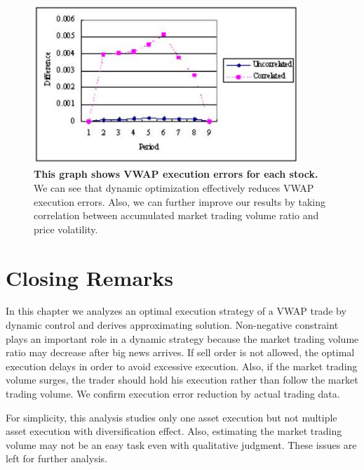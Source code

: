 \begin{figure}[htbp]
\begin{center}
 \includegraphics[width=10cm,height=6cm]{fg_d3n.png}
\end{center}
\caption[Graph of VWAP execution errors]{{\bf This graph shows VWAP execution 
errors for each stock.}
 \quad We can see that dynamic optimization effectively reduces VWAP execution 
errors.
 Also, we can further improve our results by taking correlation between 
accumulated market trading volume ratio
 and price volatility.}\label{fg_d3}
\end{figure}


\section{Closing Remarks}\label{sec_d4}
In this chapter we analyzes an optimal execution strategy of a VWAP trade by 
dynamic control and derives approximating solution. Non-negative constraint 
plays an important role in a dynamic strategy because the market trading volume 
ratio may decrease after big news arrives.  If sell order is not allowed, the 
optimal execution delays in order to avoid excessive execution.  Also, if the market 
trading volume surges, the trader should hold his execution rather than follow 
the market trading volume.  We confirm execution error reduction by actual 
trading data.

For simplicity, this analysis studies only one asset execution but not multiple 
asset execution with diversification effect.  Also, estimating the market 
trading volume may not be an easy task even with qualitative judgment.  These 
issues are left for further analysis.
